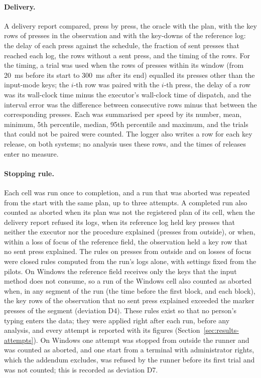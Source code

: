 \paragraph{Delivery.} A delivery report compared, press by press, the oracle with the plan, with the key rows of
presses in the observation and with the key-downs of the reference log: the delay of each press against the schedule,
the fraction of sent presses that reached each log, the rows without a sent press, and the timing of the rows. For
the timing, a trial was used when the rows of presses within its window (from 20~ms before its start to 300~ms after
its end) equalled its presses other than the input-mode keys; the $i$-th row was paired with the $i$-th press, the
delay of a row was its wall-clock time minus the executor's wall-clock time of dispatch, and the interval error was
the difference between consecutive rows minus that between the corresponding presses. Each was summarised per speed by
its number, mean, minimum, 5th percentile, median, 95th percentile and maximum, and the trials that could not be
paired were counted. The logger also writes a row for each key release, on both systems; no analysis uses these rows,
and the times of releases enter no measure.

\paragraph{Stopping rule.} Each cell was run once to completion, and a run that was aborted was repeated from the
start with the same plan, up to three attempts. A completed run also counted as aborted when its plan was not the
registered plan of its cell, when the delivery report refused its logs, when its reference log held key presses that
neither the executor nor the procedure explained (presses from outside), or when, within a loss of focus of the
reference field, the observation held a key row that no sent press explained. The rules on presses from outside and on
losses of focus were closed rules computed from the run's logs alone, with settings fixed from the pilots. On Windows
the reference field receives only the keys that the input method does not consume, so a run of the Windows cell also
counted as aborted when, in any segment of the run (the time before the first block, and each block), the key rows of
the observation that no sent press explained exceeded the marker presses of the segment (deviation D4). These rules
exist so that no person's typing enters the data; they were applied right after each run, before any analysis, and
every attempt is reported with its figures (Section~\ref{sec:results-attempts}). On Windows one attempt was stopped
from outside the runner and was counted as aborted, and one start from a terminal with administrator rights, which the
addendum excludes, was refused by the runner before its first trial and was not counted; this is recorded as deviation
D7.

